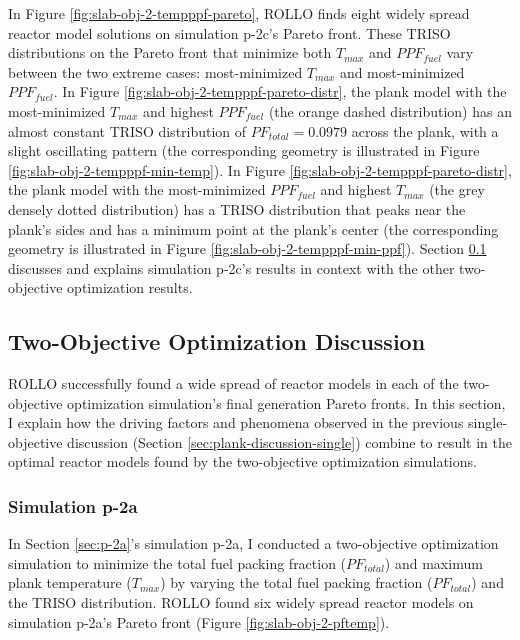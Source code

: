 In Figure \ref{fig:slab-obj-2-tempppf-pareto}, \gls{ROLLO} finds eight widely spread 
reactor model solutions on simulation p-2c's Pareto front. 
These \gls{TRISO} distributions on the Pareto front that minimize both $T_{max}$ 
and $PPF_{fuel}$ vary between the two extreme cases: 
most-minimized $T_{max}$ and most-minimized $PPF_{fuel}$.
In Figure \ref{fig:slab-obj-2-tempppf-pareto-distr}, the plank model with 
the most-minimized $T_{max}$ and highest $PPF_{fuel}$ (the orange dashed distribution) 
has an almost constant TRISO distribution of $PF_{total}=0.0979$ across the plank, 
with a slight oscillating pattern (the corresponding geometry is illustrated in Figure 
\ref{fig:slab-obj-2-tempppf-min-temp}).
In Figure \ref{fig:slab-obj-2-tempppf-pareto-distr}, the plank model with the
most-minimized $PPF_{fuel}$ and highest $T_{max}$ (the grey densely dotted 
distribution) has a TRISO distribution that peaks near the plank's sides and has 
a minimum point at the plank's center (the corresponding geometry is illustrated in Figure 
\ref{fig:slab-obj-2-tempppf-min-ppf}). 
Section \ref{sec:plank-discussion-two} discusses and explains simulation p-2c's results
in context with the other two-objective optimization results.

\subsection{Two-Objective Optimization Discussion}
\label{sec:plank-discussion-two}
\gls{ROLLO} successfully found a wide spread of reactor models in each of the 
two-objective optimization simulation's final generation Pareto fronts.
In this section, I explain how the driving factors and phenomena observed in 
the previous single-objective discussion (Section \ref{sec:plank-discussion-single}) 
combine to result in the optimal reactor models found by the two-objective optimization 
simulations. 

\subsubsection{Simulation p-2a}
In Section \ref{sec:p-2a}'s simulation p-2a, I conducted a two-objective 
optimization simulation to minimize the total fuel packing fraction ($PF_{total}$) and 
maximum plank temperature ($T_{max}$) by varying the total fuel 
packing fraction ($PF_{total}$) and the TRISO distribution. 
\gls{ROLLO} found six widely spread reactor models on simulation p-2a's Pareto 
front (Figure \ref{fig:slab-obj-2-pftemp}). 

